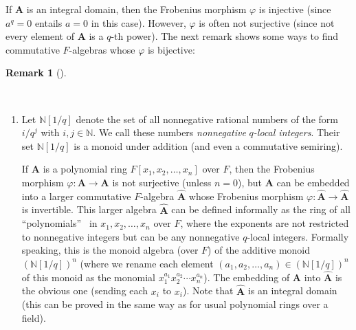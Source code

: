 \documentclass[numbers=enddot,12pt,final,onecolumn,notitlepage]{scrartcl}%
\numberwithin{exer}{section}
\theoremstyle{definition}
\newtheorem{remk}[theo]{Remark}
\newenvironment{remark}[1][]
{\begin{remk}[#1]\begin{leftbar}}
{\end{leftbar}\end{remk}}
\theoremstyle{plainsl}
\begin{document}
If $\mathbf{A}$ is an integral domain, then the Frobenius morphism $\varphi$
is injective (since $a^{q}=0$ entails $a=0$ in this case). However, $\varphi$
is often not surjective (since not every element of $\mathbf{A}$ is a $q$-th
power). The next remark shows some ways to find commutative $F$-algebras whose
$\varphi$ is bijective:

\begin{remark}
\label{rmk.phi-bij.1}\ \ 

\begin{enumerate}
\item[\textbf{(a)}] Let $\mathbb{N}\left[  1/q\right]  $ denote the set of all
nonnegative rational numbers of the form $i/q^{j}$ with $i,j\in\mathbb{N}$. We
call these numbers \emph{nonnegative }$q$\emph{-local integers}. Their set
$\mathbb{N}\left[  1/q\right]  $ is a monoid under addition (and even a
commutative semiring).

If $\mathbf{A}$ is a polynomial ring $F\left[  x_{1},x_{2},\ldots
,x_{n}\right]  $ over $F$, then the Frobenius morphism $\varphi:\mathbf{A}%
\rightarrow\mathbf{A}$ is not surjective (unless $n=0$), but $\mathbf{A}$ can
be embedded into a larger commutative $F$-algebra $\widehat{\mathbf{A}}$ whose
Frobenius morphism $\varphi:\widehat{\mathbf{A}}\rightarrow\widehat{\mathbf{A}%
}$ is invertible. This larger algebra $\widehat{\mathbf{A}}$ can be defined
informally as the ring of all \textquotedblleft polynomials\textquotedblright%
\ in $x_{1},x_{2},\ldots,x_{n}$ over $F$, where the exponents are not
restricted to nonnegative integers but can be any nonnegative $q$-local
integers. Formally speaking, this is the monoid algebra (over $F$) of the
additive monoid $\left(  \mathbb{N}\left[  1/q\right]  \right)  ^{n}$ (where
we rename each element $\left(  a_{1},a_{2},\ldots,a_{n}\right)  \in\left(
\mathbb{N}\left[  1/q\right]  \right)  ^{n}$ of this monoid as the monomial
$x_{1}^{a_{1}}x_{2}^{a_{2}}\cdots x_{n}^{a_{n}}$). The embedding of
$\mathbf{A}$ into $\widehat{\mathbf{A}}$ is the obvious one (sending each
$x_{i}$ to $x_{i}$). Note that $\widehat{\mathbf{A}}$ is an integral domain
(this can be proved in the same way as for usual polynomial rings over a field).


\end{enumerate}
\end{remark}
\end{document}
